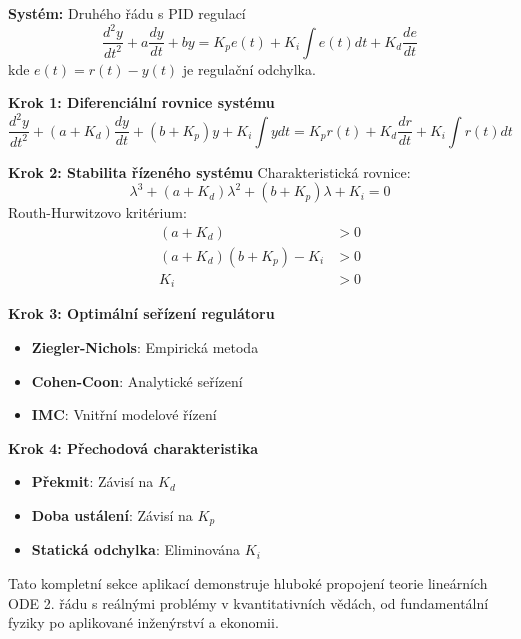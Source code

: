 \begin{example}
\label{ex:pid-regulator}

\noindent\textbf{Systém:} Druhého řádu s PID regulací
\[
\frac{d^2y}{dt^2} + a\frac{dy}{dt} + by = K_p e(t) + K_i \int e(t) dt + K_d \frac{de}{dt}
\]
kde $e(t) = r(t) - y(t)$ je regulační odchylka.

\vspace{1.5\baselineskip}

\noindent\textbf{Krok 1: Diferenciální rovnice systému}
\[
\frac{d^2y}{dt^2} + (a + K_d)\frac{dy}{dt} + (b + K_p)y + K_i \int y dt = K_p r(t) + K_d \frac{dr}{dt} + K_i \int r(t) dt
\]

\vspace{1\baselineskip}

\noindent\textbf{Krok 2: Stabilita řízeného systému}
Charakteristická rovnice:
\[
\lambda^3 + (a + K_d)\lambda^2 + (b + K_p)\lambda + K_i = 0
\]
Routh-Hurwitzovo kritérium:
\begin{align*}
(a + K_d) &> 0 \\
(a + K_d)(b + K_p) - K_i &> 0 \\
K_i &> 0
\end{align*}

\vspace{1\baselineskip}

\noindent\textbf{Krok 3: Optimální seřízení regulátoru}
\begin{itemize}
\item \textbf{Ziegler-Nichols}: Empirická metoda
\item \textbf{Cohen-Coon}: Analytické seřízení
\item \textbf{IMC}: Vnitřní modelové řízení
\end{itemize}

\vspace{1\baselineskip}

\noindent\textbf{Krok 4: Přechodová charakteristika}
\begin{itemize}
\item \textbf{Překmit}: Závisí na $K_d$
\item \textbf{Doba ustálení}: Závisí na $K_p$
\item \textbf{Statická odchylka}: Eliminována $K_i$
\end{itemize}

\end{example}

Tato kompletní sekce aplikací demonstruje hluboké propojení teorie lineárních ODE 2. řádu s reálnými problémy v kvantitativních vědách, od fundamentální fyziky po aplikované inženýrství a ekonomii.

